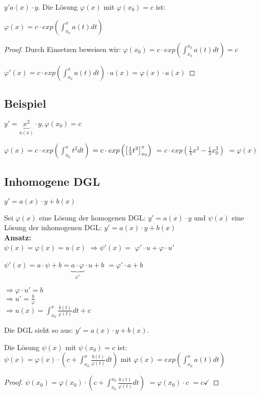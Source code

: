 \begin{satz}
$y'a(x) \cdot y$. Die Lösung $\varphi(x)$ mit $\varphi(x_0) = c$ ist: 

$\varphi(x) = c \cdot exp(\int_{x_0}^{x} a(t) dt)$ 
\end{satz}

\begin{proof}Durch Einsetzen beweisen wir: 
$\varphi(x_0) = c\cdot exp(\int_{x_0}^{x_0} a(t) dt) = c$

$\varphi'(x) = c \cdot exp(\int_{x_0}^{x} a(t) dt) \cdot a(x) = \varphi(x) \cdot a(x)$
\end{proof}

\subsection{Beispiel}
$y' = \underbrace{x^2}_{a(x)} \cdot y, \varphi(x_0) = c$

$\varphi(x) = c\cdot exp(\int_{x_0}^{x} t^2 dt) $
$=c \cdot exp \left(  \left[ \frac{1}{3} t^3 \right] _{x_0}^x \right) $
$=c\cdot exp(\frac{1}{3} x^3 - \frac{1}{3} x_0^3)$
$=\varphi(x)$

\subsection{Inhomogene DGL}
$ y' = a(x) \cdot y + b(x) $

Sei $ \varphi(x) $ eine Lösung der homogenen DGL: $ y' = a(x) \cdot y $ und 
$ \psi(x) $ eine Lösung der inhomogenen DGL: $ y' = a(x) \cdot y + b(x) $\\

\textbf{Ansatz:}\\
$ \psi(x) = \varphi(x) = u(x) $
$ \Rightarrow \psi'(x) = $ \underline{$\varphi' \cdot u + \varphi \cdot u'$} 

$ \psi'(x) = a \cdot \psi + b = \underbrace{a\cdot \varphi}_{\varphi'} \cdot u + b $
\underline{$=\varphi' \cdot a + b$}

$\Rightarrow \varphi \cdot u' = b$\\
$\Rightarrow u' = \frac{b}{\varphi}$\\
$\Rightarrow u(x) = \int_{x_0}^{x} \frac{b(t)}{\varphi(t)} dt + c$

\begin{satz}
Die DGL sieht so aus: $y' = a(x) \cdot y + b(x)$. 

Die Lösung $\psi(x)$ mit $\psi(x_0) = c$ ist: \\

$\psi(x) = \varphi(x) \cdot (c+\int_{x_0}^{x} \frac{b(t)}{\varphi(t)} dt)$ mit
$\varphi(x) = exp(\int_{x_0}^{x} a(t) dt)$
\end{satz}

\begin{proof}
$ \psi(x_0) = \varphi(x_0) \cdot (c+ \int_{x_0}^{x_0} \frac{b(t)}{\varphi(t)} dt)$
$=\varphi(x_0) \cdot c $
$=c \checkmark$
\end{proof}
